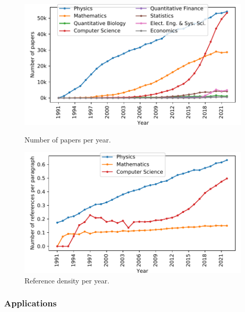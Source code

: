 \begin{figure}
  \centering
  \includegraphics[width=0.7\linewidth]{figures/ref_covgran/numpprs}
  \caption{Number of papers per year.}
  \label{fig:numpprs}

  \includegraphics[width=0.7\linewidth]{figures/ref_covgran/refdensity}
  \caption{Reference density per year.}
  \label{fig:refdensity}
\end{figure}


\subsubsection{Applications}\label{sec:applications}


